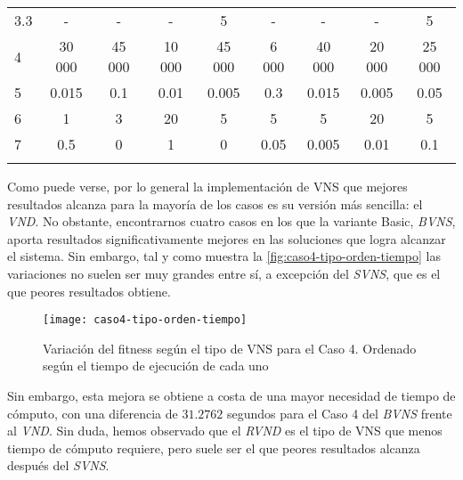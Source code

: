 \begin{table}[h]
{\begin{tabular}{lcccccccc}
			3.3       &          -           &          -           &          -           &          5           &          -           &          -           &          -           &          5           \\
			4         &        30 000        &        45 000        &        10 000        &        45 000        &        6 000         &        40 000        &        20 000        &        25 000        \\
			5         &        0.015         &         0.1          &         0.01         &        0.005         &         0.3          &        0.015         &        0.005         &         0.05         \\
			6         &          1           &          3           &          20          &          5           &          5           &          5           &          20          &          5           \\
			7         &         0.5          &          0           &          1           &          0           &         0.05         &        0.005         &         0.01         &         0.1          \\ \hline
			          & \multicolumn{1}{l}{} & \multicolumn{1}{l}{} & \multicolumn{1}{l}{} & \multicolumn{1}{l}{} & \multicolumn{1}{l}{} & \multicolumn{1}{l}{} & \multicolumn{1}{l}{} & \multicolumn{1}{l}{}
		\end{tabular}%
	}
\end{table}

Como puede verse, por lo general la implementación de VNS que mejores resultados alcanza para la mayoría de los casos es su versión más sencilla: el \textit{VND}. No obstante, encontrarnos cuatro casos en los que la variante Basic, \textit{BVNS}, aporta resultados significativamente mejores en las soluciones que logra alcanzar el sistema. Sin embargo, tal y como muestra la \autoref{fig:caso4-tipo-orden-tiempo} las variaciones no suelen ser muy grandes entre sí, a excepción del \textit{SVNS}, que es el que peores resultados obtiene.

\begin{figure}
	\centering
	\texttt{[image: caso4-tipo-orden-tiempo]}
	\caption{Variación del fitness según el tipo de VNS para el Caso 4. Ordenado según el tiempo de ejecución de cada uno}
	\label{fig:caso4-tipo-orden-tiempo}
\end{figure}

Sin embargo, esta mejora se obtiene a costa de una mayor necesidad de tiempo de cómputo, con una diferencia de $31.2762$ segundos para el Caso 4 del \textit{BVNS} frente al \textit{VND}. Sin duda, hemos observado que el \textit{RVND} es el tipo de VNS que menos tiempo de cómputo requiere, pero suele ser el que peores resultados alcanza después del \textit{SVNS}. 

